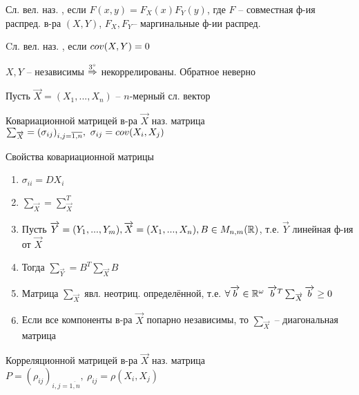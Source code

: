 \OPR Сл. вел. \XY наз. , если $F(x,y)=F_X(x)F_Y(y)$, где $F$ -- совместная ф-ия распред. в-ра $(X,Y)$, $F_X,F_Y$-- маргинальные ф-ии распред. \XY

\OPR Cл. вел. \XY наз. , если $cov(X,Y)=0$

\ZAM $X,Y$ -- независимы $\stackrel{3\degree}{\Rightarrow}$ некоррелированы. Обратное неверно

Пусть $\overrightarrow{X}=(X_1,...,X_n)$ -- $n$-мерный сл. вектор

\OPR Ковариационной матрицей в-ра $\overrightarrow{X}$ наз. матрица $\sum_{\overrightarrow{X}}=(\sigma_{ij})_{i,j=\overline{1,n}},~\sigma_{ij}=cov(X_i,X_j)$

Свойства ковариационной матрицы
\begin{enumerate}[topsep=0pt, leftmargin=20pt, noitemsep, label=\arabic*\degree]
	\item $\sigma_{ii}=DX_i$
	
	\item $\sum_{\overrightarrow{X}}=\sum^T_{\overrightarrow{X}}$
	
	\item Пусть $\overrightarrow{Y}=(Y_1,...,Y_m), \overrightarrow{X}=(X_1,...,X_n), B\in M_{n,m}(\mathbb{R})$, т.е. $\overrightarrow{Y}$ линейная ф-ия от $\overrightarrow{X}$
	\item [] Тогда $\sum_{\overrightarrow{Y}}=B^T\sum_{\overrightarrow{X}}B$
	
	\item Матрица $\sum_{\overrightarrow{X}}$ явл. неотриц. определённой, т.е. $\forall \overrightarrow{b}\in\mathbb{R}^\omega~\overrightarrow{b}^T\sum_{\overrightarrow{X}}\overrightarrow{b}\geq 0$
	
	\item Если все компоненты в-ра
$\overrightarrow{X}$ попарно независимы, то
$\sum_{\overrightarrow{X}}$ -- диагональная
матрица
\end{enumerate}

\OPR Корреляционной матрицей в-ра $\overrightarrow{X}$ наз. матрица $P=(\rho_{ij})_{i,j=\overline{1,n}}, ~\rho_{ij}=\rho(X_i,X_j)$

\clearpage
